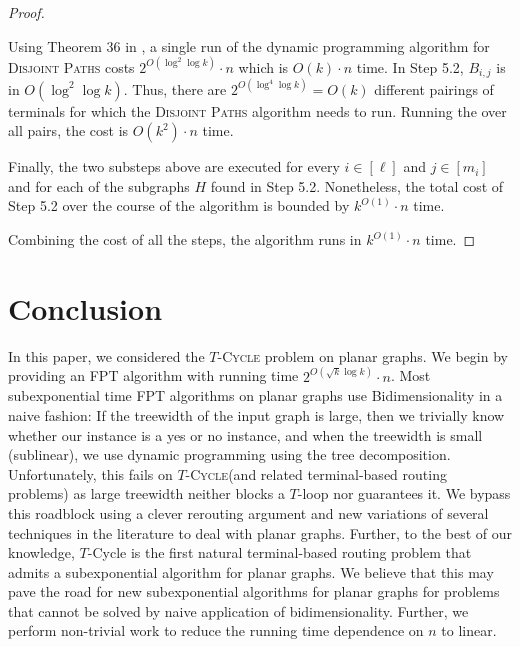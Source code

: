 \documentclass{article}
\numberwithin{claimcounter}{lemma}
\newcommand{\tcycle}{$T$-\textsc{Cycle}\xspace}
\newcommand{\dispaths}{\textsc{Disjoint Paths}\xspace}
\begin{document}
\begin{proof}
\begin{enumerate}[(1.)]
        Using Theorem 36 in \cite{cho2023parameterized}, a single run of the dynamic programming algorithm for \dispaths costs $2^{O(\log^{2}\log k)}\cdot n$ which is $O(k)\cdot n$ time.
        In Step 5.2, $B_{i,j}$ is in $O(\log^2\log k)$. Thus, there are  $2^{O(\log^4\log k)} = O(k)$ different pairings of terminals for which the \dispaths algorithm needs to run. Running the over all pairs, the cost is $O(k^2) \cdot n$ time.

        Finally, the two substeps above are executed for every $i \in [\ell]$ and $j \in [m_i]$ and for each of the subgraphs $H$ found in Step 5.2. Nonetheless, the total cost of Step 5.2 over the course of the algorithm is bounded by $k^{O(1)} \cdot n$ time.
    \end{enumerate}
    Combining the cost of all the steps, the algorithm runs in $k^{O(1)} \cdot n$ time. 
\end{proof}













\section{Conclusion} \label{sec:conc}
In this paper, we considered the \tcycle problem on planar graphs. 
We begin by providing an FPT algorithm with running time $2^{O(\sqrt{k} \log k)}\cdot n$. Most subexponential time FPT algorithms on planar graphs use Bidimensionality in a naive fashion: If the treewidth of the input graph is large, then we trivially know whether our instance is a yes or no instance, and when the treewidth is small (sublinear), we use dynamic programming using the tree decomposition. Unfortunately, this fails on \tcycle (and related terminal-based routing problems) as large treewidth neither blocks a $T$-loop nor guarantees it. We bypass this roadblock using a clever rerouting argument and new variations of several techniques in the literature to deal with planar graphs. Further, to the best of our knowledge, {\sc $T$-Cycle} is the first natural terminal-based routing problem that admits a subexponential algorithm for planar graphs. We believe that this may pave the road for new subexponential algorithms for planar graphs for problems that cannot be solved by naive application of bidimensionality. Further, we perform non-trivial work to reduce the running time dependence on $n$ to linear. 
\end{document}
